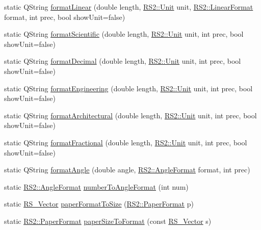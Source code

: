 \begin{DoxyCompactItemize}
\item 
static Q\-String \hyperlink{classRS__Units_ae876795e761628a91ae79e66b10fc39b}{format\-Linear} (double length, \hyperlink{classRS2_ad859751df6978737e4f35ec111ff9828}{R\-S2\-::\-Unit} unit, \hyperlink{classRS2_a0fa0506f1e870c169e8d8c1d58d3fa6e}{R\-S2\-::\-Linear\-Format} format, int prec, bool show\-Unit=false)
\item 
static Q\-String \hyperlink{classRS__Units_a944aac6c69dcfc3a1f361a0bea352a9e}{format\-Scientific} (double length, \hyperlink{classRS2_ad859751df6978737e4f35ec111ff9828}{R\-S2\-::\-Unit} unit, int prec, bool show\-Unit=false)
\item 
static Q\-String \hyperlink{classRS__Units_a9ebb6902248e219184dfab66948d6883}{format\-Decimal} (double length, \hyperlink{classRS2_ad859751df6978737e4f35ec111ff9828}{R\-S2\-::\-Unit} unit, int prec, bool show\-Unit=false)
\item 
static Q\-String \hyperlink{classRS__Units_ab07cbb26854e3807f49937f299d0e051}{format\-Engineering} (double length, \hyperlink{classRS2_ad859751df6978737e4f35ec111ff9828}{R\-S2\-::\-Unit} unit, int prec, bool show\-Unit=false)
\item 
static Q\-String \hyperlink{classRS__Units_ab4ec17de85ddd36eb62b67d4edd3680f}{format\-Architectural} (double length, \hyperlink{classRS2_ad859751df6978737e4f35ec111ff9828}{R\-S2\-::\-Unit} unit, int prec, bool show\-Unit=false)
\item 
static Q\-String \hyperlink{classRS__Units_a83ed1be860a37ca4f8c9d133bb966cd7}{format\-Fractional} (double length, \hyperlink{classRS2_ad859751df6978737e4f35ec111ff9828}{R\-S2\-::\-Unit} unit, int prec, bool show\-Unit=false)
\item 
static Q\-String \hyperlink{classRS__Units_a1e09b15c546e262907e85d3a80ef8686}{format\-Angle} (double angle, \hyperlink{classRS2_a9c7a07b03f910b04154536a28c151277}{R\-S2\-::\-Angle\-Format} format, int prec)
\item 
static \hyperlink{classRS2_a9c7a07b03f910b04154536a28c151277}{R\-S2\-::\-Angle\-Format} \hyperlink{classRS__Units_a913a1b496927b3339e60169182c57c89}{number\-To\-Angle\-Format} (int num)
\item 
static \hyperlink{classRS__Vector}{R\-S\-\_\-\-Vector} \hyperlink{classRS__Units_acb64071b40ccb4e1e34c4c01106ad4c1}{paper\-Format\-To\-Size} (\hyperlink{classRS2_a99636ecac997160f1e2982859a043cb4}{R\-S2\-::\-Paper\-Format} p)
\item 
static \hyperlink{classRS2_a99636ecac997160f1e2982859a043cb4}{R\-S2\-::\-Paper\-Format} \hyperlink{classRS__Units_a39726263387c4efc5a0f186edd7a54a3}{paper\-Size\-To\-Format} (const \hyperlink{classRS__Vector}{R\-S\-\_\-\-Vector} s)

\end{DoxyCompactItemize}
